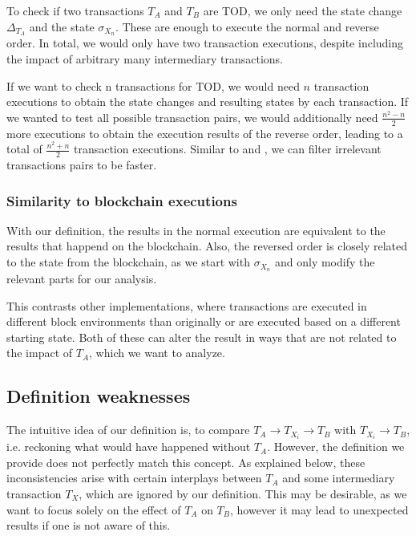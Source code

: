\documentclass[draft,final]{vutinfth} %
\begin{document}
To check if two transactions $T_A$ and $T_B$ are TOD, we only need the state change $\Delta_{T_A}$ and the state $\sigma_{X_n}$. These are enough to execute the normal and reverse order. In total, we would only have two transaction executions, despite including the impact of arbitrary many intermediary transactions.

If we want to check n transactions for TOD, we would need $n$ transaction executions to obtain the state changes and resulting states by each transaction. If we wanted to test all possible transaction pairs, we would additionally need $\frac{n^2 - n}{2}$ more executions to obtain the execution results of the reverse order, leading to a total of $\frac{n^2 + n}{2}$ transaction executions. Similar to \cite{torres_frontrunner_2021} and \cite{zhang_combatting_2023}, we can filter irrelevant transactions pairs to be faster.

\subsubsection{Similarity to blockchain executions}

With our definition, the results in the normal execution are equivalent to the results that happend on the blockchain. Also, the reversed order is closely related to the state from the blockchain, as we start with $\sigma_{X_n}$ and only modify the relevant parts for our analysis.

This contrasts other implementations, where transactions are executed in different block environments than originally or are executed based on a different starting state. Both of these can alter the result in ways that are not related to the impact of $T_A$, which we want to analyze.

\subsection{Definition weaknesses}

The intuitive idea of our definition is, to compare $T_A \rightarrow T_{X_i} \rightarrow T_B$ with $T_{X_i} \rightarrow T_B$, i.e. reckoning what would have happened without $T_A$. However, the definition we provide does not perfectly match this concept. As explained below, these inconsistencies arise with certain interplays between $T_A$ and some intermediary transaction $T_X$, which are ignored by our definition. This may be desirable, as we want to focus solely on the effect of $T_A$ on $T_B$, however it may lead to unexpected results if one is not aware of this.
\end{document}
